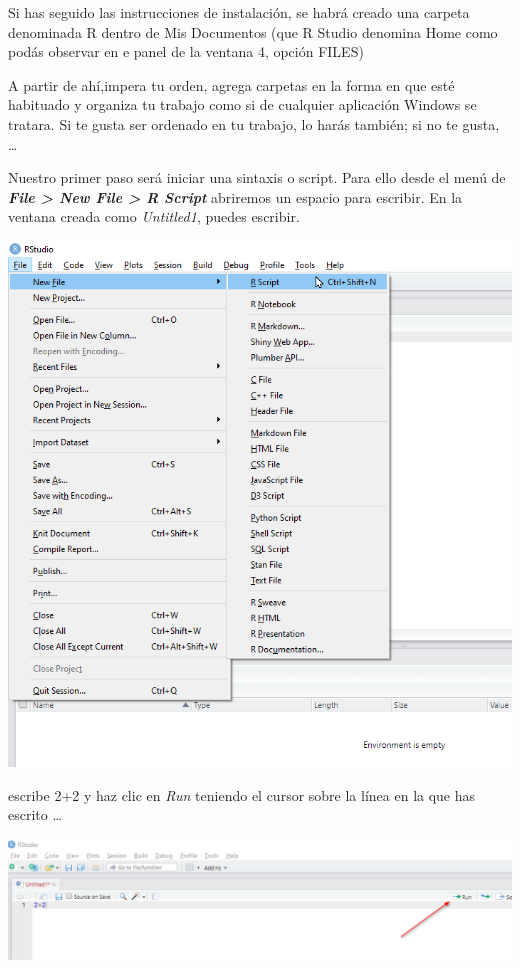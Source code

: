 \documentclass[
]{book}
\begin{document}
Si has seguido las instrucciones de instalación, se habrá creado una carpeta denominada R dentro de Mis Documentos (que R Studio denomina Home como podás observar en e panel de la ventana 4, opción FILES)

A partir de ahí,impera tu orden, agrega carpetas en la forma en que esté habituado y organiza tu trabajo como si de cualquier aplicación Windows se tratara. Si te gusta ser ordenado en tu trabajo, lo harás también; si no te gusta, \ldots{}

Nuestro primer paso será iniciar una sintaxis o script. Para ello desde el menú de \textbf{\emph{File \textgreater{} New File \textgreater{} R Script}} abriremos un espacio para escribir. En la ventana creada como \emph{Untitled1}, puedes escribir.

\includegraphics{data/RS04.png}

escribe 2+2 y haz clic en \emph{Run} teniendo el cursor sobre la línea en la que has escrito \ldots{}

\includegraphics{data/RS05.png}
\end{document}
